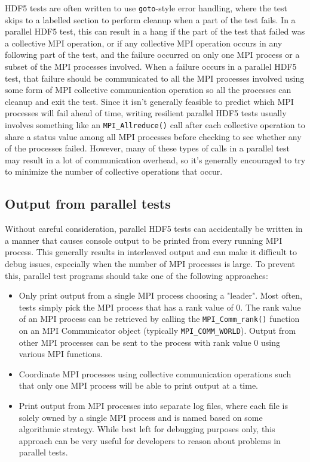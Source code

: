\documentclass[../HDF5_RFC.tex]{subfiles}
\begin{document}
HDF5 tests are often written to use \texttt{goto}-style error handling, where the test skips to a
labelled section to perform cleanup when a part of the test fails. In a parallel HDF5 test, this
can result in a hang if the part of the test that failed was a collective MPI operation, or if any
collective MPI operation occurs in any following part of the test, and the failure occurred on only
one MPI process or a subset of the MPI processes involved. When a failure occurs in a parallel HDF5
test, that failure should be communicated to all the MPI processes involved using some form of MPI
collective communication operation so all the processes can cleanup and exit the test. Since it isn't
generally feasible to predict which MPI processes will fail ahead of time, writing resilient parallel
HDF5 tests usually involves something like an \texttt{MPI\_Allreduce()} call after each collective
operation to share a status value among all MPI processes before checking to see whether any of the
processes failed. However, many of these types of calls in a parallel test may result in a lot of
communication overhead, so it's generally encouraged to try to minimize the number of collective
operations that occur.

\subsection{Output from parallel tests}

Without careful consideration, parallel HDF5 tests can accidentally be written in a manner that causes
console output to be printed from every running MPI process. This generally results in interleaved output
and can make it difficult to debug issues, especially when the number of MPI processes is large. To
prevent this, parallel test programs should take one of the following approaches:

\begin{itemize}

    \item Only print output from a single MPI process choosing a "leader". Most often, tests simply pick
          the MPI process that has a rank value of 0. The rank value of an MPI process can be retrieved
          by calling the \texttt{MPI\_Comm\_rank()} function on an MPI Communicator object (typically
          \texttt{MPI\_COMM\_WORLD}). Output from other MPI processes can be sent to the process with
          rank value 0 using various MPI functions.
    \item Coordinate MPI processes using collective communication operations such that only one MPI
          process will be able to print output at a time.
    \item Print output from MPI processes into separate log files, where each file is solely owned by a
          single MPI process and is named based on some algorithmic strategy. While best left for
          debugging purposes only, this approach can be very useful for developers to reason about problems
          in parallel tests.

\end{itemize}
\end{document}
